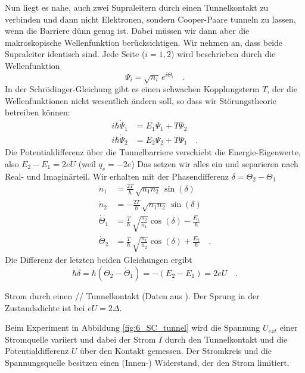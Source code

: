 Nun liegt es nahe, auch zwei Supraleitern durch einen Tunnelkontakt zu verbinden und dann nicht Elektronen, sondern Cooper-Paare tunneln zu lassen, wenn die Barriere dünn genug ist. Dabei müssen wir dann aber die makroskopische Wellenfunktion berücksichtigen. Wir nehmen an, dass beide Supraleiter identisch sind. Jede Seite ($i=1, 2$) wird beschrieben durch die Wellenfunktion 
\begin{equation}
  \Psi_i = \sqrt{n_i} \, e^{i \Theta_i} \quad .
\end{equation}
In der Schrödinger-Gleichung gibt es einen schwachen Kopplungsterm $T$, der die Wellenfunktionen nicht wesentlich ändern soll, so dass wir Störungstheorie betreiben können:
\begin{align}
    i \hbar \dot{\Psi}_1 & =  E_1 \Psi_1 + T \Psi_2 \\ 
    i \hbar \dot{\Psi}_2 & =  E_2 \Psi_2 + T \Psi_1 \quad .
\end{align}
Die Potentialdifferenz über die Tunnelbarriere verschiebt die Energie-Eigenwerte, also $E_2 - E_1 = 2 e U$ (weil $q_s = -2 e$) Das setzen wir alles ein und separieren nach Real- und Imaginärteil. Wir erhalten mit der Phasendifferenz $\delta = \Theta_2 - \Theta_1$
\begin{align}
    \dot{n}_1 & = \frac{2 T}{\hbar} \, \sqrt{n_1 n_2} \,  \sin(\delta) \\
    \dot{n}_2 & = -\frac{2 T}{\hbar} \, \sqrt{n_1 n_2} \,  \sin(\delta) \\
    \dot{\Theta}_1 &= \frac{T}{\hbar} \, \sqrt{\frac{n_2}{n_1}} \cos(\delta) - \frac{E_1}{\hbar} \\
    \dot{\Theta}_2 &= \frac{T}{\hbar} \, \sqrt{\frac{n_1}{n_2}} \cos(\delta) + \frac{E_2}{\hbar} \quad .
\end{align} 
Die Differenz der letzten beiden Gleichungen ergibt
\begin{equation}
   \hbar \dot{\delta} =  \hbar ( \dot{\Theta}_2 -  \dot{\Theta}_1 ) = - (E_2 - E_1) = 2eU \quad .
\end{equation}


\begin{marginfigure}
    \caption{Strom durch einen // Tunnelkontakt (Daten aus \cite{Langenberg1966}). Der Sprung in der Zustandsdichte ist bei $eU=2\Delta$.
    \label{fig:6_SC_tunnel}}
\end{marginfigure}


Beim Experiment in Abbildung \ref{fig:6_SC_tunnel} wird die Spannung $U_{ext}$ einer Stromquelle variiert und dabei der Strom $I$ durch den Tunnelkontakt und die Potentialdifferenz $U$ über den Kontakt gemessen. Der Stromkreis und die Spannungsquelle besitzen einen (Innen-) Widerstand, der den Strom limitiert.

